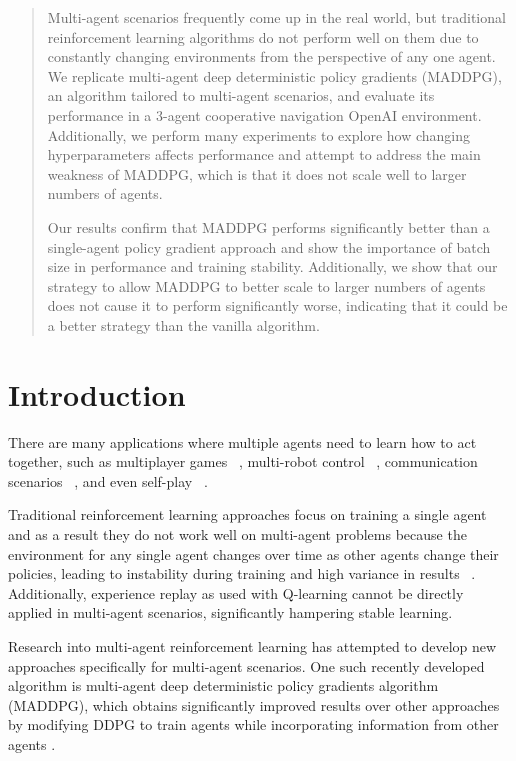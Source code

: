 \documentclass{article}
\begin{document}
\begin{abstract}
Multi-agent scenarios frequently come up in the real world, but traditional reinforcement learning algorithms do not perform well on them due to constantly changing environments from the perspective of any one agent. We replicate multi-agent deep deterministic policy gradients (MADDPG), an algorithm tailored to multi-agent scenarios, and evaluate its performance in a 3-agent cooperative navigation OpenAI environment. Additionally, we perform many experiments to explore how changing hyperparameters affects performance and attempt to address the main weakness of MADDPG, which is that it does not scale well to larger numbers of agents.

Our results confirm that MADDPG performs significantly better than a single-agent policy gradient approach and show the importance of batch size in performance and training stability. Additionally, we show that our strategy to allow MADDPG to better scale to larger numbers of agents does not cause it to perform significantly worse, indicating that it could be a better strategy than the vanilla algorithm.
\end{abstract}


\section{Introduction}
\label{submission}

There are many applications where multiple agents need to learn how to act together, such as multiplayer games ~\cite{multigames}, multi-robot control ~\cite{multirobot}, communication scenarios ~\cite{communication}, and even self-play ~\cite{selfplay}.

Traditional reinforcement learning approaches focus on training a single agent and as a result they do not work well on multi-agent problems because the environment for any single agent changes over time as other agents change their policies, leading to instability during training and high variance in results ~\cite{unstable}. Additionally, experience replay as used with Q-learning cannot be directly applied in multi-agent scenarios, significantly hampering stable learning.

Research into multi-agent reinforcement learning has attempted to develop new approaches specifically for multi-agent scenarios. One such recently developed algorithm is multi-agent deep deterministic policy gradients algorithm (MADDPG), which obtains significantly improved results over other approaches by modifying DDPG to train agents while incorporating information from other agents \cite{maddpg}.
\end{document}
